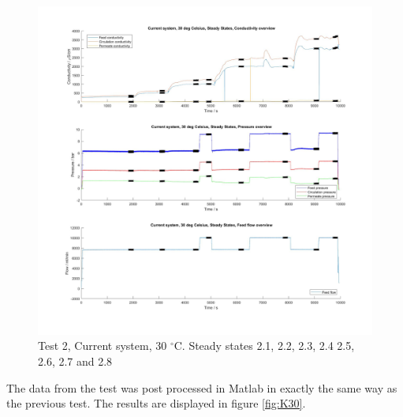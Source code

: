\begin{figure}[H]
    \centering
    \includegraphics[width=1.1\textwidth]{overview30}
    \caption{Test 2, Current system, 30 $^{\circ}$C. Steady states 2.1, 2.2, 2.3, 2.4 2.5, 2.6, 2.7 and 2.8}
    \label{fig:overw30}
\end{figure}

\newpage


The data from the test was post processed in Matlab in exactly the same way as the previous test. The results are displayed in figure \ref{fig:K30}. 

